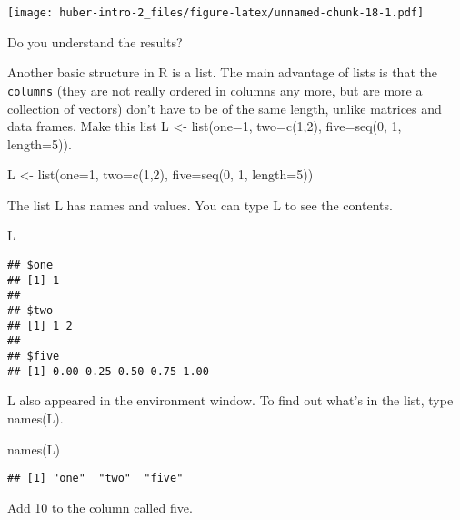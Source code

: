 \documentclass[
]{article}
\newenvironment{Shaded}{\begin{snugshade}}{\end{snugshade}}
\newcommand{\AttributeTok}[1]{\textcolor[rgb]{0.77,0.63,0.00}{#1}}
\newcommand{\DecValTok}[1]{\textcolor[rgb]{0.00,0.00,0.81}{#1}}
\newcommand{\FunctionTok}[1]{\textcolor[rgb]{0.00,0.00,0.00}{#1}}
\newcommand{\NormalTok}[1]{#1}
\newcommand{\OtherTok}[1]{\textcolor[rgb]{0.56,0.35,0.01}{#1}}
\newcommand{\SpecialCharTok}[1]{\textcolor[rgb]{0.00,0.00,0.00}{#1}}
\begin{document}
\texttt{[image: huber-intro-2\_files/figure-latex/unnamed-chunk-18-1.pdf]}

Do you understand the results?

Another basic structure in R is a list. The main advantage of lists is
that the \texttt{columns} (they are not really ordered in columns any
more, but are more a collection of vectors) don't have to be of the same
length, unlike matrices and data frames. Make this list L \textless-
list(one=1, two=c(1,2), five=seq(0, 1, length=5)).

\begin{Shaded}
\begin{Highlighting}[]
\NormalTok{L }\OtherTok{\textless{}{-}} \FunctionTok{list}\NormalTok{(}\AttributeTok{one=}\DecValTok{1}\NormalTok{, }\AttributeTok{two=}\FunctionTok{c}\NormalTok{(}\DecValTok{1}\NormalTok{,}\DecValTok{2}\NormalTok{), }\AttributeTok{five=}\FunctionTok{seq}\NormalTok{(}\DecValTok{0}\NormalTok{, }\DecValTok{1}\NormalTok{, }\AttributeTok{length=}\DecValTok{5}\NormalTok{))}
\end{Highlighting}
\end{Shaded}

The list L has names and values. You can type L to see the contents.

\begin{Shaded}
\begin{Highlighting}[]
\NormalTok{L}
\end{Highlighting}
\end{Shaded}

\begin{verbatim}
## $one
## [1] 1
## 
## $two
## [1] 1 2
## 
## $five
## [1] 0.00 0.25 0.50 0.75 1.00
\end{verbatim}

L also appeared in the environment window. To find out what's in the
list, type names(L).

\begin{Shaded}
\begin{Highlighting}[]
\FunctionTok{names}\NormalTok{(L)}
\end{Highlighting}
\end{Shaded}

\begin{verbatim}
## [1] "one"  "two"  "five"
\end{verbatim}

Add 10 to the column called five.

\begin{Shaded}
\end{Shaded}
\end{document}
